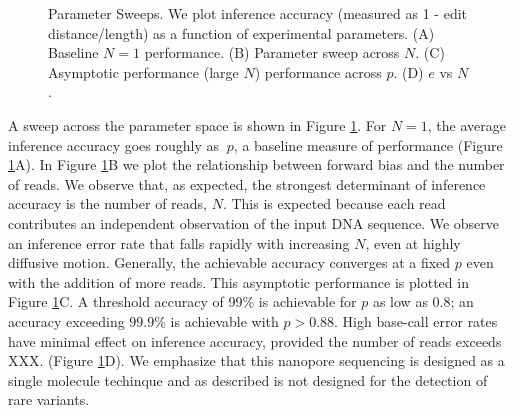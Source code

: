 \documentclass{biophys_letter}
\begin{document}
\begin{figure}
\caption{Parameter Sweeps. We plot inference accuracy (measured as 1 - edit distance/length) as a function of experimental parameters. (A) Baseline $N=1$ performance. (B) Parameter sweep across $N$. (C) Asymptotic performance (large $N$) performance across $p$. (D) $e$ vs $N$.}
\label{fig:parameter_sweeps}
\end{figure}

A sweep across the parameter space is shown in Figure \ref{fig:parameter_sweeps}.
For $N=1$, the average inference accuracy goes roughly as $~p$, a baseline measure of performance (Figure \ref{fig:parameter_sweeps}A).
In Figure \ref{fig:parameter_sweeps}B we plot the relationship between forward bias and the number of reads.
We observe that, as expected, the strongest determinant of inference accuracy is the number of reads, $N$.
This is expected because each read contributes an independent observation of the input DNA sequence.
We observe an inference error rate that falls rapidly with increasing $N$, even at highly diffusive motion. 
Generally, the achievable accuracy converges at a fixed $p$ even with the addition of more reads.
This asymptotic performance is plotted in Figure \ref{fig:parameter_sweeps}C.
A threshold accuracy of 99\% is achievable for $p$ as low as $0.8$; an accuracy exceeding $99.9\%$ is achievable with $p>0.88$.
High base-call error rates have minimal effect on inference accuracy, provided the number of reads exceeds XXX. (Figure \ref{fig:parameter_sweeps}D).
We emphasize that this nanopore sequencing is designed as a single molecule techinque and as described is not designed for the detection of rare variants.

\end{document}
